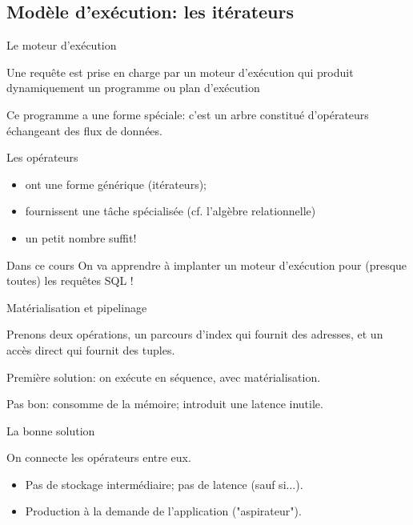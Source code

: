 
\subsection{Modèle d'exécution: les itérateurs}

\begin{frame}{Le moteur d'exécution}

Une requête est prise en charge par un \alert{moteur d'exécution} 
qui produit dynamiquement un programme  ou \alert{plan d'exécution}

\vfill

Ce programme a une forme spéciale: c'est un arbre constitué \alert{d'opérateurs}
échangeant des \alert{flux de données}.

\vfill

Les opérateurs

\begin{itemize}
  \item ont une forme générique (\alert{itérateurs});
  \item fournissent une tâche spécialisée (cf. l'algèbre relationnelle)
  \item un petit nombre suffit!
\end{itemize}

\vfill

\begin{block}{Dans ce cours}
On va apprendre à implanter un moteur d'exécution pour (presque toutes) les
 requêtes SQL !
\end{block}
\end{frame}



\begin{frame}{Matérialisation et pipelinage}

Prenons deux opérations, un parcours d'index qui fournit des adresses, et
un accès direct qui fournit des tuples.

\vfill

Première solution: on exécute en séquence, avec \alert{matérialisation}.

\smallskip


\smallskip

\alert{Pas bon}: consomme de la mémoire; introduit une latence inutile.

\end{frame}


\begin{frame}[fragile]{La bonne solution}

On \alert{connecte} les opérateurs entre eux.

\vfill


\vfill

\begin{itemize}
  \item \alert{Pas de stockage intermédiaire; pas de latence } (sauf si...).
  \item Production \alert{à la demande} de l'application ("aspirateur").
\end{itemize}
\end{frame}


